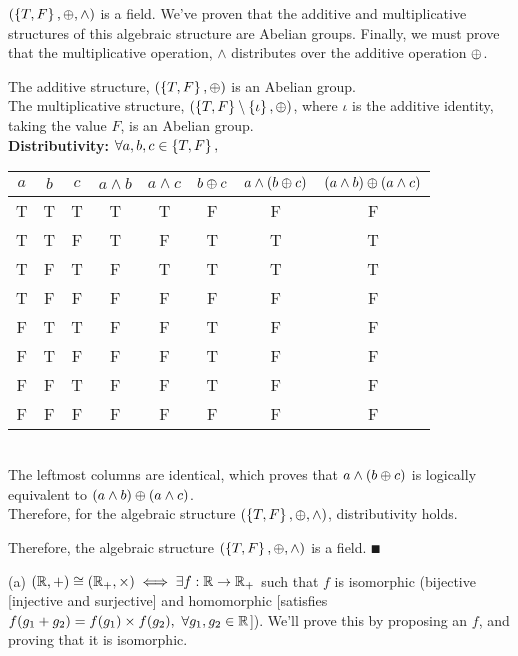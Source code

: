 \documentclass[a4paper, 11pt]{report}
\begin{document}
\Theom $(\left\lbrace T,F \right\rbrace, \oplus, \land)$ is a field.
\proof We've proven that the additive and multiplicative structures of this algebraic structure are Abelian groups. Finally, we must prove that the multiplicative operation, $\land$ distributes over the additive operation $\oplus$. \\
\begin{list}{}{\setlength{\leftmargin}{0.5in}\setlength{\topsep}{0pt}}\item 
  The additive structure, $(\left\lbrace T,F \right\rbrace, \oplus)$ is an Abelian group. \\
  The multiplicative structure, $(\left\lbrace T,F \right\rbrace\setminus\left\lbrace \iota \right\rbrace, \oplus)$, where $\iota$ is the additive identity, taking the value $F$, is an Abelian group. \\
  \textbf{Distributivity:} $\forall a,b,c\in\left\lbrace T,F \right\rbrace,$ \\
  \begin{tabular}{ccc|ccc|cc}
    $a$ & $b$ & $c$ & $a\land b$ & $a\land c$ & $b\oplus c$ & $a\land(b\oplus c)$ & $(a\land b)\oplus(a\land c)$ \\ \hline
    T & T & T & T & T & F & F & F \\
    T & T & F & T & F & T & T & T \\
    T & F & T & F & T & T & T & T \\
    T & F & F & F & F & F & F & F \\
    F & T & T & F & F & T & F & F \\
    F & T & F & F & F & T & F & F \\
    F & F & T & F & F & T & F & F \\
    F & F & F & F & F & F & F & F \\
  \end{tabular} \\
  The leftmost columns are identical, which proves that $a\land(b\oplus c)$ is logically equivalent   to $(a\land b)\oplus(a\land c)$. \\
  Therefore, for the algebraic structure $(\left\lbrace T,F \right\rbrace,\oplus,\land)$, distributivity holds. \\
\end{list}
Therefore, the algebraic structure $(\left\lbrace T,F \right\rbrace,\oplus,\land)$ is a field. $\QED$

\newpage
{}
\sol (a)
$(\mathbb{R},+)\cong(\mathbb{R}_+,\times)\iff\exists f:\mathbb{R}\to\mathbb{R}_+$ such that $f$ is isomorphic (bijective [injective and surjective] and homomorphic [satisfies $f(g_1+g_2) = f(g_1)\times f(g_2),\ \forall g_1,g_2\in\bbr$]). We'll prove this by proposing an $f$, and proving that it is isomorphic. \\
\end{document}
